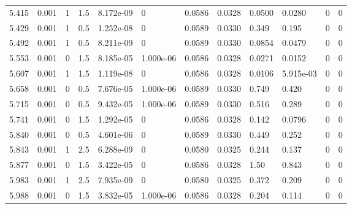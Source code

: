 \documentclass[preview]{standalone}
\begin{document}
{{{\begin{tabular}{L{1.2cm}C{1.2cm} C{0.3cm}C{0.5cm} C{1.4cm}C{1.4cm} C{1.4cm}C{1.4cm} C{1.6cm}C{1.6cm} C{1.6cm}C{1.6cm}}
  5.415  &  0.001  & 1     & 1.5 &  8.172e-09  & 0  &  0.0586&   0.0328& 0.0500 & 0.0280   &  0 & 0  \\ 
  5.429  &  0.001  & 1     & 0.5 &  1.252e-08  & 0  &  0.0589&   0.0330& 0.349 & 0.195   &  0 & 0  \\ 
  5.492  &  0.001  & 1     & 0.5 &  8.211e-09  & 0  &  0.0589&   0.0330& 0.0854 & 0.0479   &  0 & 0  \\ 
  5.553  &  0.001  & 0     & 1.5 &  8.185e-05  & 1.000e-06  &  0.0586&   0.0328& 0.0271 & 0.0152   &  0 & 0  \\ 
  5.607  &  0.001  & 1     & 1.5 &  1.119e-08  & 0  &  0.0586&   0.0328& 0.0106 & 5.915e-03   &  0 & 0  \\ 
  5.658  &  0.001  & 0     & 0.5 &  7.676e-05  & 1.000e-06  &  0.0589&   0.0330& 0.749 & 0.420   &  0 & 0  \\ 
  5.715  &  0.001  & 0     & 0.5 &  9.432e-05  & 1.000e-06  &  0.0589&   0.0330& 0.516 & 0.289   &  0 & 0  \\ 
  5.741  &  0.001  & 0     & 1.5 &  1.292e-05  & 0  &  0.0586&   0.0328& 0.142 & 0.0796   &  0 & 0  \\ 
  5.840  &  0.001  & 0     & 0.5 &  4.601e-06  & 0  &  0.0589&   0.0330& 0.449 & 0.252   &  0 & 0  \\ 
  5.843  &  0.001  & 1     & 2.5 &  6.288e-09  & 0  &  0.0580&   0.0325& 0.244 & 0.137   &  0 & 0  \\ 
  5.877  &  0.001  & 0     & 1.5 &  3.422e-05  & 0  &  0.0586&   0.0328& 1.50 & 0.843   &  0 & 0  \\ 
  5.983  &  0.001  & 1     & 2.5 &  7.935e-09  & 0  &  0.0580&   0.0325& 0.372 & 0.209   &  0 & 0  \\ 
  5.988  &  0.001  & 0     & 1.5 &  3.832e-05  & 1.000e-06  &  0.0586&   0.0328& 0.204 & 0.114   &  0 & 0  \\ 
\hline 
\end{tabular} 

}}}
\end{document}
